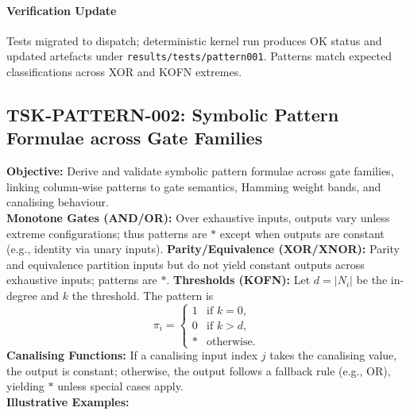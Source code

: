 \documentclass{article}
\begin{document}
\paragraph{Verification Update} Tests migrated to dispatch; deterministic kernel run produces OK status and updated artefacts under \texttt{results/tests/pattern001}. Patterns match expected classifications across XOR and KOFN extremes.

\subsection{TSK-PATTERN-002: Symbolic Pattern Formulae across Gate Families}
\textbf{Objective:} Derive and validate symbolic pattern formulae across gate families, linking column-wise patterns to gate semantics, Hamming weight bands, and canalising behaviour.\\
\textbf{Monotone Gates (AND/OR):} Over exhaustive inputs, outputs vary unless extreme configurations; thus patterns are \(*\) except when outputs are constant (e.g., identity via unary inputs).
\textbf{Parity/Equivalence (XOR/XNOR):} Parity and equivalence partition inputs but do not yield constant outputs across exhaustive inputs; patterns are \(*\).
\textbf{Thresholds (KOFN):} Let \(d=\lvert N_i\rvert\) be the in-degree and \(k\) the threshold. The pattern is
\[
\pi_i=\begin{cases}
1 & \text{if } k=0,\\
0 & \text{if } k>d,\\
* & \text{otherwise.}
\end{cases}
\]
\textbf{Canalising Functions:} If a canalising input index \(j\) takes the canalising value, the output is constant; otherwise, the output follows a fallback rule (e.g., OR), yielding \(*\) unless special cases apply.\\
\textbf{Illustrative Examples:}
\end{document}

